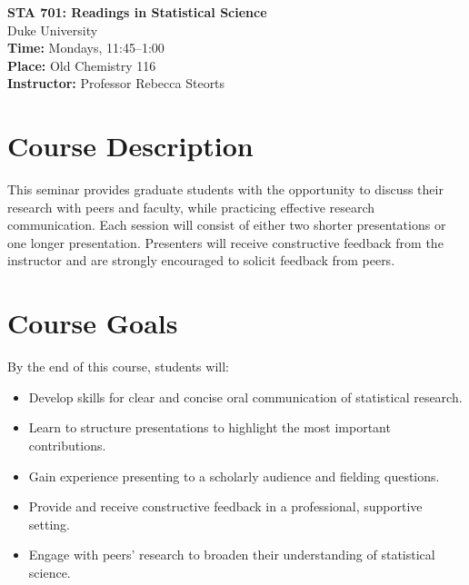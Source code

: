\documentclass[11pt]{article}
\begin{document}
\begin{center}
    \Large \textbf{STA 701: Readings in Statistical Science} \\
    \normalsize Duke University \\
    \vspace{0.5em}
    \textbf{Time:} Mondays, 11:45--1:00 \\
    \textbf{Place:} Old Chemistry 116 \\
    \textbf{Instructor:} Professor Rebecca Steorts
\end{center}

\vspace{1em}

\section*{Course Description}
This seminar provides graduate students with the opportunity to discuss their research with peers and faculty, while practicing effective research communication. Each session will consist of either two shorter presentations or one longer presentation. Presenters will receive constructive feedback from the instructor and are strongly encouraged to solicit feedback from peers.  

\section*{Course Goals}
By the end of this course, students will:
\begin{itemize}
    \item Develop skills for clear and concise oral communication of statistical research.
    \item Learn to structure presentations to highlight the most important contributions.
    \item Gain experience presenting to a scholarly audience and fielding questions.
    \item Provide and receive constructive feedback in a professional, supportive setting.
    \item Engage with peers’ research to broaden their understanding of statistical science.
\end{itemize}
\end{document}
